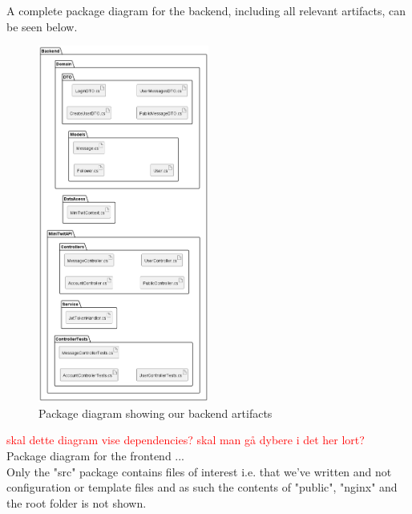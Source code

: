 A complete package diagram for the backend, including all relevant artifacts, can be seen below.
\begin{figure}[H]
 \centering
 \includegraphics[width = 0.5\textwidth]{Images/backend_complete_package.png}
 \caption{Package diagram showing our backend artifacts}
 \label{fig:BackendCompletePackageDiagram}
\end{figure}
\textcolor{red}{skal dette diagram vise dependencies?}
\textcolor{red}{skal man gå dybere i det her lort?} \\

\newpage
Package diagram for the frontend ... \\
Only the "src" package contains files of interest i.e. that we've written and not configuration or template files and as such the contents of "public", "nginx" and the root folder is not shown.

